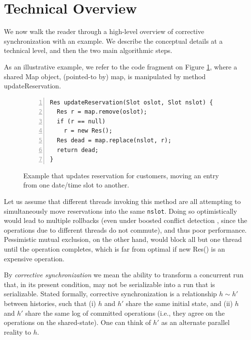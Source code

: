 \section{Technical Overview}

We now walk the reader through a high-level overview of corrective synchronization with an example. We  describe the conceptual details at a technical level, and then the two main algorithmic steps.

%
As an illustrative example, we refer to the code fragment
on Figure \ref{Fi:introMotivating},
where a shared {\sf Map} object, (pointed-to by) {\sf map}, is manipulated by method {\sf updateReservation}.
%
\begin{figure}
\centering
	\begin{lstlisting}[numbers=left,xleftmargin=15pt]
Res updateReservation(Slot oslot, Slot nslot) {
  Res r = map.remove(oslot);
  if (r == null)
    r = new Res();
  Res dead = map.replace(nslot, r);
  return dead;
}
	\end{lstlisting}
        \caption{\label{Fi:introMotivating} Example that updates reservation for customers, moving an entry from one date/time slot to another.}
\end{figure}
%
Let us assume that different threads invoking this method
are all attempting to simultaneously move reservations into the same \lstinline$nslot$.
Doing so optimistically would lead to multiple rollbacks (even under boosted conflict detection \cite{ppopp08}, since the operations due to different threads do not commute), and thus poor performance. Pessimistic mutual exclusion, on the other hand, would block all but one thread until the operation completes, which is far from optimal if {\sf new Res()} is an expensive operation.



\newcommand\hrel{\sim}
%
By \emph{corrective synchronization} we mean the ability to transform a concurrent run that, in its present condition, may not be serializable into a run that is serializable. Stated formally, corrective synchronization is a relationship $h \hrel h'$ between histories, such that (i) $h$ and $h'$ share the same initial state, and (ii) $h$ and $h'$ share the same log of committed operations (i.e., they agree on the operations on the shared-state). One can think of $h'$ as an alternate parallel reality to $h$.

